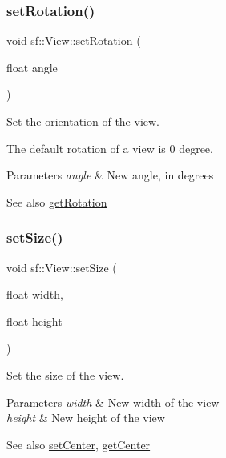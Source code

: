 \subsubsection{\texorpdfstring{setRotation()}{setRotation()}}
{\footnotesize\ttfamily void sf\+::\+View\+::set\+Rotation (\begin{DoxyParamCaption}\item[{float}]{angle }\end{DoxyParamCaption})}



Set the orientation of the view. 

The default rotation of a view is 0 degree.


\begin{DoxyParams}{Parameters}
{\em angle} & New angle, in degrees\\
\hline
\end{DoxyParams}
\begin{DoxySeeAlso}{See also}
\mbox{\hyperlink{classsf_1_1_view_a324d8885f4ab17f1f7b0313580c9b84e}{get\+Rotation}} \begin{DoxyVerb}\end{DoxyVerb}
 
\end{DoxySeeAlso}
\mbox{\label{classsf_1_1_view_a9525b73fe9fbaceb9568faf56b399dab}} 
\subsubsection{\texorpdfstring{setSize()}{setSize()}\hspace{0.1cm}{\footnotesize\ttfamily [1/2]}}
{\footnotesize\ttfamily void sf\+::\+View\+::set\+Size (\begin{DoxyParamCaption}\item[{float}]{width,  }\item[{float}]{height }\end{DoxyParamCaption})}



Set the size of the view. 


\begin{DoxyParams}{Parameters}
{\em width} & New width of the view \\
\hline
{\em height} & New height of the view\\
\hline
\end{DoxyParams}
\begin{DoxySeeAlso}{See also}
\mbox{\hyperlink{classsf_1_1_view_aa8e3fedb008306ff9811163545fb75f2}{set\+Center}}, \mbox{\hyperlink{classsf_1_1_view_a7f4443c194c691ae4dcf8fd9dd0eaa46}{get\+Center}} \begin{DoxyVerb}\end{DoxyVerb}
 
\end{DoxySeeAlso}
\mbox{\label{classsf_1_1_view_a9e08d471ce21aa0e69ce55ff9de66d29}} 
